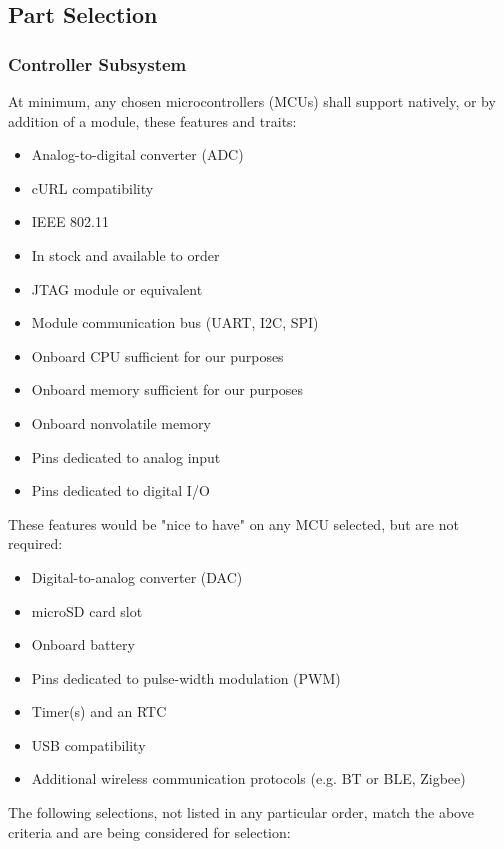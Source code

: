 \subsection{Part Selection}
\subsubsection{Controller Subsystem} 

\begin{flushleft}
    At minimum, any chosen microcontrollers (MCUs) shall support natively, or by addition of a
    module, these features and traits:
    \begin{itemize}
        \item Analog-to-digital converter (ADC)
        \item cURL compatibility
        \item IEEE 802.11
        \item In stock and available to order
        \item JTAG module or equivalent
        \item Module communication bus (UART, I2C, SPI)
        \item Onboard CPU sufficient for our purposes
        \item Onboard memory sufficient for our purposes
        \item Onboard nonvolatile memory
        \item Pins dedicated to analog input
        \item Pins dedicated to digital I/O
    \end{itemize}
    These features would be "nice to have" on any MCU selected, but are not required:
    \begin{itemize}
        \item Digital-to-analog converter (DAC)
        \item microSD card slot
        \item Onboard battery
        \item Pins dedicated to pulse-width modulation (PWM)
        \item Timer(s) and an RTC
        \item USB compatibility
        \item Additional wireless communication protocols (e.g. BT or BLE, Zigbee)
    \end{itemize}
    The following selections, not listed in any particular order, match the above criteria and are
    being considered for selection:
\end{flushleft}
